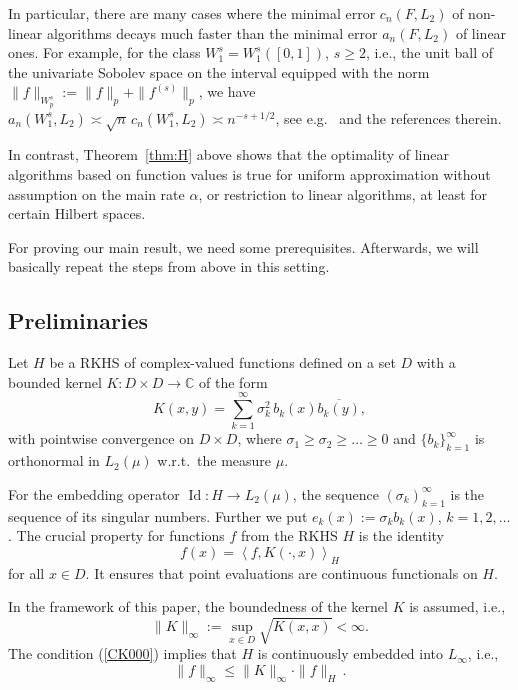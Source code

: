 \documentclass[a4paper,12pt]{amsart}
\theoremstyle{definition}
\theoremstyle{remark}
\newcommand{\ipr}[2]{\left\langle#1,#2\right\rangle}
\DeclareMathOperator{\Id}{Id}
\begin{document}
{In particular, }
there are many cases where 
the minimal error $c_n(F,L_2)$ of non-linear algorithms decays much faster  {than the minimal error $a_n(F, L_2)$ of linear ones}.
For example, for the class $W^s_1=W^s_1([0,1])$, $s\ge2$, 
i.e., 
the unit ball of the 
univariate 
 {Sobolev}
space 
on the interval equipped with the norm 
$\|f\|_{W^s_p}:=\|f\|_p+\|f^{(s)}\|_p$, 
we have 
$a_n(W^s_1,L_2)\asymp \sqrt{n}\, c_{n}(W^s_1,L_2)\asymp n^{-s+1/2}$, 
see e.g.~\cite[Theorem~VII.1.1]{Pinkus85} and the references therein.

\goodbreak 

In contrast, Theorem~\ref{thm:H} above shows that
the optimality of linear algorithms based on function values
is true for uniform approximation
without assumption on the main rate $\alpha$,  
or restriction to linear algorithms, 
at least for certain Hilbert spaces. 




{
For proving our main result, we need some prerequisites.  
Afterwards, we will basically repeat the steps from above in this setting.}

\subsection{Preliminaries}%
Let
$H$ be a RKHS of complex-valued functions defined on 
a set $D$ with a 
bounded kernel $K\colon D\times D \rightarrow \mathbb{C}$  of the form 
\begin{equation}\label{kernel}
K(x,y) = \sum_{k=1}^{\infty}\sigma_k^2\, b_k(x) \overline{b_k(y)},
\end{equation}
with pointwise convergence on $D \times D$, where $\sigma_1\ge \sigma_2\ge \hdots \ge 0$
 and $\{b_k\}_{k=1}^\infty$ is orthonormal in $L_2(\mu)$ w.r.t.\ the measure $\mu$.

For the embedding operator $\Id\colon H \rightarrow L_2(\mu)$, 
the sequence $( \sigma_k)_{k=1}^{\infty}$ is the sequence of its singular numbers. 
Further we put $e_k(x) := \sigma_k  b_k (x) $, $k=1, 2, \dots$.
 The crucial property for functions $f$ from the RKHS $H$ is the identity
 \begin{displaymath}
 	f(x) = \ipr{f}{K(\cdot,x)}_H
 \end{displaymath}
 for all $x \in D$. It ensures that point evaluations are continuous functionals on $H$. 
 
 In the framework of this paper, the boundedness of the kernel $K$ is assumed, i.e.,
 \begin{equation} \label{CK000}
 	\|K\|_{\infty} := \sup\limits_{x \in D} \sqrt{K(x,x)} < \infty.
 \end{equation}
 The condition (\ref{CK000}) implies that $H$ is continuously embedded into $L_\infty$, i.e.,
 \begin{displaymath}
 	\|f\|_\infty \leq  \|K\|_{\infty}\cdot\|f\|_{H}\,.
 \end{displaymath}
\end{document}
